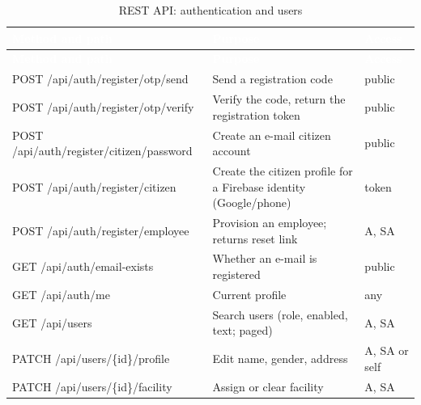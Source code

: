 {\tabfont\rowband
\begin{longtable}{@{}>{\raggedright\arraybackslash}p{}>{\raggedright\arraybackslash}p{}>{\raggedright\arraybackslash}p{}@{}}
\caption{REST API: authentication and users}\label{tab:api-1}\\
\rowcolor{najdanavy}\textcolor{white}{\sffamily\bfseries\small Method and path} & \textcolor{white}{\sffamily\bfseries\small Purpose} & \textcolor{white}{\sffamily\bfseries\small Access}\\
\endfirsthead
\rowcolor{najdanavy}\textcolor{white}{\sffamily\bfseries\small Method and path} & \textcolor{white}{\sffamily\bfseries\small Purpose} & \textcolor{white}{\sffamily\bfseries\small Access}\\
\endhead
\bottomrule\endlastfoot
POST /\allowbreak{}api/\allowbreak{}auth/\allowbreak{}register/\allowbreak{}otp/\allowbreak{}send & Send a registration code & public\\
POST /\allowbreak{}api/\allowbreak{}auth/\allowbreak{}register/\allowbreak{}otp/\allowbreak{}verify & Verify the code, return the registration token & public\\
POST /\allowbreak{}api/\allowbreak{}auth/\allowbreak{}register/\allowbreak{}citizen/\allowbreak{}password & Create an e-mail citizen account & public\\
POST /\allowbreak{}api/\allowbreak{}auth/\allowbreak{}register/\allowbreak{}citizen & Create the citizen profile for a Firebase identity (Google/\allowbreak{}phone) & token\\
POST /\allowbreak{}api/\allowbreak{}auth/\allowbreak{}register/\allowbreak{}employee & Provision an employee; returns reset link & A, SA\\
GET /\allowbreak{}api/\allowbreak{}auth/\allowbreak{}email-exists & Whether an e-mail is registered & public\\
GET /\allowbreak{}api/\allowbreak{}auth/\allowbreak{}me & Current profile & any\\
GET /\allowbreak{}api/\allowbreak{}users & Search users (role, enabled, text; paged) & A, SA\\
PATCH /\allowbreak{}api/\allowbreak{}users/\allowbreak{}\{id\}/\allowbreak{}profile & Edit name, gender, address & A, SA or self\\
PATCH /\allowbreak{}api/\allowbreak{}users/\allowbreak{}\{id\}/\allowbreak{}facility & Assign or clear facility & A, SA\\

\end{longtable}}
